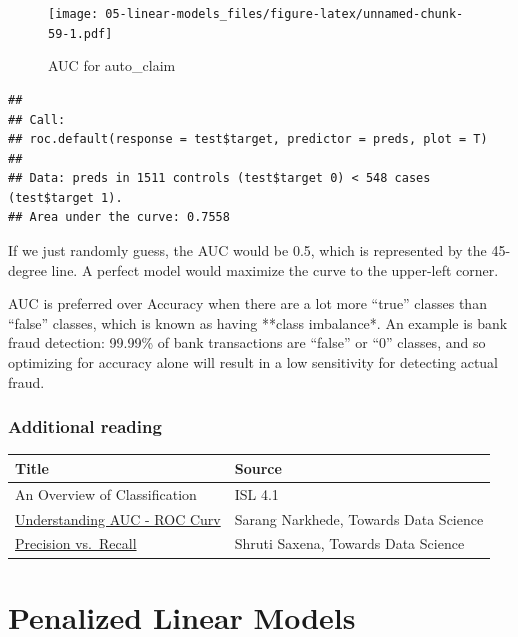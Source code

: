 \documentclass[openany]{book}
\begin{document}
\begin{figure}
\centering
\texttt{[image: 05-linear-models\_files/figure-latex/unnamed-chunk-59-1.pdf]}
\caption{\label{fig:unnamed-chunk-59}AUC for auto\_claim}
\end{figure}

\begin{verbatim}
## 
## Call:
## roc.default(response = test$target, predictor = preds, plot = T)
## 
## Data: preds in 1511 controls (test$target 0) < 548 cases (test$target 1).
## Area under the curve: 0.7558
\end{verbatim}

If we just randomly guess, the AUC would be 0.5, which is represented by the 45-degree line. A perfect model would maximize the curve to the upper-left corner.

AUC is preferred over Accuracy when there are a lot more ``true'' classes than ``false'' classes, which is known as having **class imbalance*. An example is bank fraud detection: 99.99\% of bank transactions are ``false'' or ``0'' classes, and so optimizing for accuracy alone will result in a low sensitivity for detecting actual fraud.

\hypertarget{additional-reading}{%
\subsection{Additional reading}\label{additional-reading}}

\begin{longtable}[]{@{}ll@{}}
\toprule
Title & Source\tabularnewline
\midrule
\endhead
An Overview of Classification & ISL 4.1\tabularnewline
\href{https://towardsdatascience.com/understanding-auc-roc-curve-68b2303cc9c5\#:~:targetText=What\%20is\%20AUC\%20\%2D\%20ROC\%20Curve\%3F,capable\%20of\%20distinguishing\%20between\%20classes.}{Understanding AUC - ROC Curv} & Sarang Narkhede, Towards Data Science\tabularnewline
\href{https://towardsdatascience.com/precision-vs-recall-386cf9f89488\#:~:targetText=Precision\%20and\%20recall\%20are\%20two,correctly\%20classified\%20by\%20your\%20algorithm.}{Precision vs.~Recall} & Shruti Saxena, Towards Data Science\tabularnewline
\bottomrule
\end{longtable}

\hypertarget{penalized-linear-models}{%
\chapter{Penalized Linear Models}\label{penalized-linear-models}}
\end{document}
